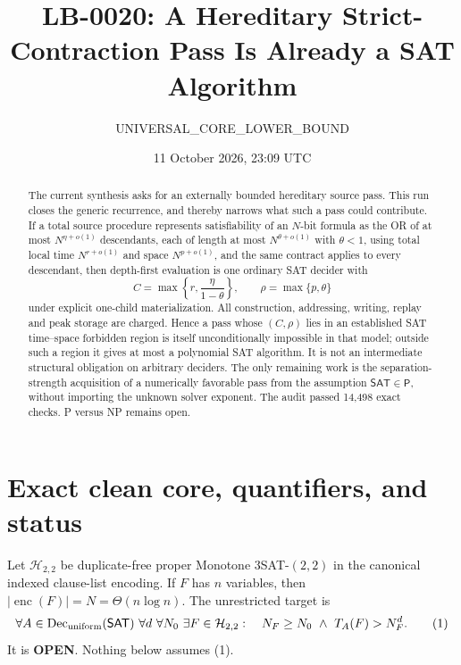 \documentclass[11pt]{article}
\title{LB-0020: A Hereditary Strict-Contraction Pass Is Already a SAT Algorithm}
\author{UNIVERSAL\_CORE\_LOWER\_BOUND}
\date{11 October 2026, 23:09 UTC}
\newcommand{\SAT}{\mathsf{SAT}}
\newcommand{\Htwo}{\mathcal H_{2,2}}
\newcommand{\OPEN}{\textbf{OPEN}}
\begin{document}
\maketitle

\begin{abstract}
The current synthesis asks for an externally bounded hereditary source pass.
This run closes the generic recurrence, and thereby narrows what such a pass
could contribute.  If a total source procedure represents satisfiability of
an $N$-bit formula as the OR of at most $N^{\eta+o(1)}$ descendants, each of
length at most $N^{\theta+o(1)}$ with $\theta<1$, using total local time
$N^{r+o(1)}$ and space $N^{p+o(1)}$, and the same contract applies to every
descendant, then depth-first evaluation is one ordinary SAT decider with
\[
 C=\max\left\{r,\frac{\eta}{1-\theta}\right\},\qquad
 \rho=\max\{p,\theta\}
\]
under explicit one-child materialization.  All construction, addressing,
writing, replay and peak storage are charged.  Hence a pass whose $(C,\rho)$
lies in an established SAT time--space forbidden region is itself
unconditionally impossible in that model; outside such a region it gives at
most a polynomial SAT algorithm.  It is not an intermediate structural
obligation on arbitrary deciders.  The only remaining work is the
separation-strength acquisition of a numerically favorable pass from the
assumption $\SAT\in\mathsf P$, without importing the unknown solver exponent.
The audit passed 14,498 exact checks.  P versus NP remains open.
\end{abstract}

\section{Exact clean core, quantifiers, and status}

Let $\Htwo$ be duplicate-free proper Monotone $3$SAT-$(2,2)$ in the canonical
indexed clause-list encoding.  If $F$ has $n$ variables, then
$|\operatorname{enc}(F)|=N=\Theta(n\log n)$.  The unrestricted target is
\[
 \forall A\in\operatorname{Dec}_{\rm uniform}(\SAT)\ \forall d\ \forall N_0\
 \exists F\in\Htwo:\quad N_F\ge N_0\ \land\ T_A(F)>N_F^d.       \tag{1}
\]
It is \OPEN.  Nothing below assumes (1).
\end{document}

